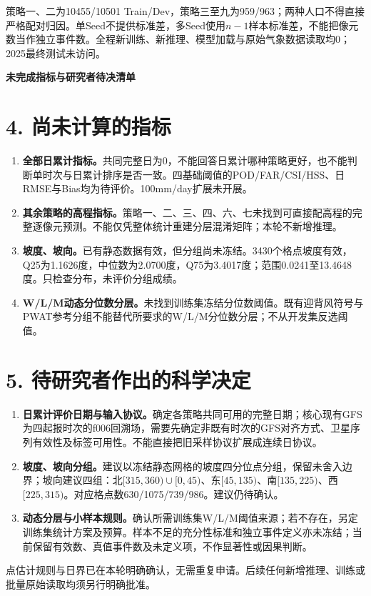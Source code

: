 \documentclass[UTF8,a4paper,10pt]{ctexart}
\begin{document}
策略一、二为10455/10501 Train/Dev，策略三至九为959/963；两种人口不得直接严格配对归因。单Seed不提供标准差，多Seed使用$n-1$样本标准差，不能把像元数当作独立事件数。全程新训练、新推理、模型加载与原始气象数据读取均0；2025最终测试未访问。

\newpage
{\LARGE\bfseries 未完成指标与研究者待决清单}\par

\section*{4. 尚未计算的指标}
\begin{enumerate}
\item \textbf{全部日累计指标。}共同完整日为0，不能回答日累计哪种策略更好，也不能判断单时次与日累计排序是否一致。四基础阈值的POD/FAR/CSI/HSS、日RMSE与Bias均为待评价。100mm/day扩展未开展。
\item \textbf{其余策略的高程指标。}策略一、二、三、四、六、七未找到可直接配高程的完整逐像元预测。不能仅凭整体统计重建分层混淆矩阵；本轮不新增推理。
\item \textbf{坡度、坡向。}已有静态数据有效，但分组尚未冻结。3430个格点坡度有效，Q25为1.1626度，中位数为2.0700度，Q75为3.4017度；范围0.0241至13.4648度。只检查分布，未评价分组成绩。
\item \textbf{W/L/M动态分位数分层。}未找到训练集冻结分位数阈值。既有迎背风符号与PWAT参考分组不能替代所要求的W/L/M分位数分层；不从开发集反选阈值。
\end{enumerate}

\section*{5. 待研究者作出的科学决定}
\begin{enumerate}
\item \textbf{日累计评价日期与输入协议。}确定各策略共同可用的完整日期；核心现有GFS为四起报时次的f006回溯场，需要先确定非既有时次的GFS对齐方式、卫星序列有效性及标签可用性。不能直接把旧采样协议扩展成连续日协议。
\item \textbf{坡度、坡向分组。}建议以冻结静态网格的坡度四分位点分组，保留未舍入边界；坡向建议四组：北$[315,360)\cup[0,45)$、东$[45,135)$、南$[135,225)$、西$[225,315)$。对应格点数630/1075/739/986。建议仍待确认。
\item \textbf{动态分层与小样本规则。}确认所需训练集W/L/M阈值来源；若不存在，另定训练集统计方案及预算。样本不足的充分性标准和独立事件定义亦未冻结；当前保留有效数、真值事件数及未定义项，不作显著性或因果判断。
\end{enumerate}
点估计规则与日界已在本轮明确确认，无需重复申请。后续任何新增推理、训练或批量原始读取均须另行明确批准。
\end{document}
